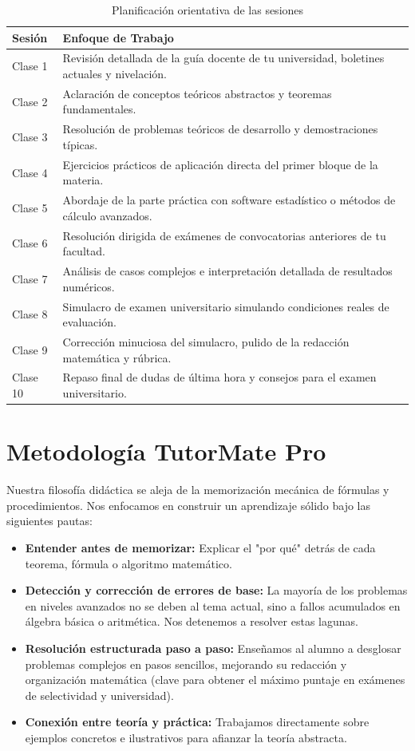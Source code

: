 \documentclass[11pt,a4paper]{article}
\begin{document}
\begin{table}[h]
\centering
\renewcommand{\arraystretch}{1.3}
\begin{tabular}{|l|p{11cm}|}
\hline
\rowcolor{primary}
\color{white}\textbf{Sesión} & \color{white}\textbf{Enfoque de Trabajo} \\ \hline
 Clase 1 & Revisión detallada de la guía docente de tu universidad, boletines actuales y nivelación. \\ \hline
 Clase 2 & Aclaración de conceptos teóricos abstractos y teoremas fundamentales. \\ \hline
 Clase 3 & Resolución de problemas teóricos de desarrollo y demostraciones típicas. \\ \hline
 Clase 4 & Ejercicios prácticos de aplicación directa del primer bloque de la materia. \\ \hline
 Clase 5 & Abordaje de la parte práctica con software estadístico o métodos de cálculo avanzados. \\ \hline
 Clase 6 & Resolución dirigida de exámenes de convocatorias anteriores de tu facultad. \\ \hline
 Clase 7 & Análisis de casos complejos e interpretación detallada de resultados numéricos. \\ \hline
 Clase 8 & Simulacro de examen universitario simulando condiciones reales de evaluación. \\ \hline
 Clase 9 & Corrección minuciosa del simulacro, pulido de la redacción matemática y rúbrica. \\ \hline
 Clase 10 & Repaso final de dudas de última hora y consejos para el examen universitario. \\ \hline
\end{tabular}
\caption{Planificación orientativa de las sesiones}
\end{table}

\newpage
\section{Metodología TutorMate Pro}
Nuestra filosofía didáctica se aleja de la memorización mecánica de fórmulas y procedimientos. Nos enfocamos en construir un aprendizaje sólido bajo las siguientes pautas:
\begin{itemize}
    \item \textbf{Entender antes de memorizar:} Explicar el "por qué" detrás de cada teorema, fórmula o algoritmo matemático.
    \item \textbf{Detección y corrección de errores de base:} La mayoría de los problemas en niveles avanzados no se deben al tema actual, sino a fallos acumulados en álgebra básica o aritmética. Nos detenemos a resolver estas lagunas.
    \item \textbf{Resolución estructurada paso a paso:} Enseñamos al alumno a desglosar problemas complejos en pasos sencillos, mejorando su redacción y organización matemática (clave para obtener el máximo puntaje en exámenes de selectividad y universidad).
    \item \textbf{Conexión entre teoría y práctica:} Trabajamos directamente sobre ejemplos concretos e ilustrativos para afianzar la teoría abstracta.
\end{itemize}
\end{document}
